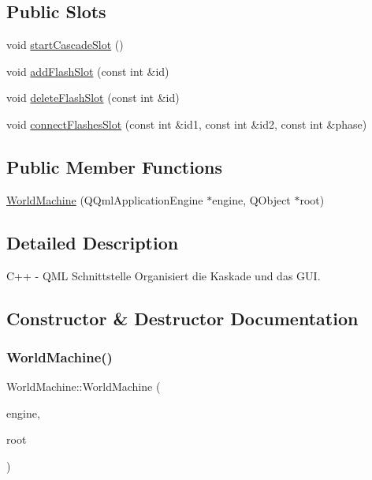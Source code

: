 \subsection*{Public Slots}
\begin{DoxyCompactItemize}
\item 
void \mbox{\hyperlink{class_world_machine_aa59dea1c70b3767e42a624daba7497b9}{start\+Cascade\+Slot}} ()
\item 
void \mbox{\hyperlink{class_world_machine_a0985510eda06d6ed11cab70c2cc234f1}{add\+Flash\+Slot}} (const int \&id)
\item 
void \mbox{\hyperlink{class_world_machine_abdd88afd0bef7ed98054e19cf59487c4}{delete\+Flash\+Slot}} (const int \&id)
\item 
void \mbox{\hyperlink{class_world_machine_adb2d5067594fa2f04f4c1035025ebe86}{connect\+Flashes\+Slot}} (const int \&id1, const int \&id2, const int \&phase)
\end{DoxyCompactItemize}
\subsection*{Public Member Functions}
\begin{DoxyCompactItemize}
\item 
\mbox{\hyperlink{class_world_machine_aafd4474fe539494cdb9a0e030a50d82c}{World\+Machine}} (Q\+Qml\+Application\+Engine $\ast$engine, Q\+Object $\ast$root)
\end{DoxyCompactItemize}


\subsection{Detailed Description}
C++ -\/ Q\+ML Schnittstelle Organisiert die Kaskade und das G\+UI. 

\subsection{Constructor \& Destructor Documentation}
\mbox{\label{class_world_machine_aafd4474fe539494cdb9a0e030a50d82c}} 
\subsubsection{\texorpdfstring{World\+Machine()}{WorldMachine()}}
{\footnotesize\ttfamily World\+Machine\+::\+World\+Machine (\begin{DoxyParamCaption}\item[{Q\+Qml\+Application\+Engine $\ast$}]{engine,  }\item[{Q\+Object $\ast$}]{root }\end{DoxyParamCaption})\hspace{0.3cm}{\ttfamily [inline]}}



